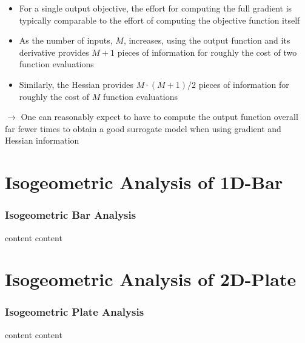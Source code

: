 \documentclass{beamer}
\begin{document}
\begin{frame}[allowframebreaks]
\begin{itemize}
\begin{itemize}

\item For a single output objective, the effort for computing the full gradient is typically comparable to the effort of computing the objective function itself

\item As the number of inputs, $M$, increases, using the output function and its derivative provides \mbox{$M+1$} pieces of information for roughly the cost of two function evaluations

\item Similarly, the Hessian provides \mbox{$M \cdot (M+1)/2$} pieces of information for roughly the cost of $M$ function evaluations

\end{itemize}

$\rightarrow$ One can reasonably expect to have to compute the output function overall far fewer times to obtain a good surrogate model when using gradient and Hessian information

\end{itemize}

\end{frame}



\section{Isogeometric Analysis of 1D-Bar}
\begin{frame}[allowframebreaks] \frametitle{Isogeometric Bar Analysis}
  content
  \newpage
  content
  \newpage
\end{frame}


\section{Isogeometric Analysis of 2D-Plate}
\begin{frame}[allowframebreaks] \frametitle{Isogeometric Plate Analysis}
  content
  \newpage
  content
  \newpage
\end{frame}
\end{document}
